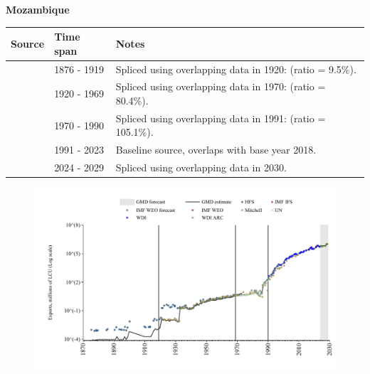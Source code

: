 \documentclass[12pt,a4paper,landscape]{article}
\begin{document}
\begin{adjustbox}{max totalsize={\paperwidth}{\paperheight},center}
\begin{minipage}[t][\textheight][t]{\textwidth}
\vspace*{0.5cm}
{}
\begin{center}
{\Large\bfseries Mozambique}
\end{center}
\vspace{0.5cm}
\begin{table}[H]
\centering
\small
\begin{tabular}{|l|l|l|}
\hline
\textbf{Source} & \textbf{Time span} & \textbf{Notes} \\
\hline
\rowcolor{white}\cite{HFS}& 1876 - 1919 &Spliced using overlapping data in 1920: (ratio = 9.5\%).\\
\rowcolor{lightgray}\cite{Mitchell}& 1920 - 1969 &Spliced using overlapping data in 1970: (ratio = 80.4\%).\\
\rowcolor{white}\cite{UN}& 1970 - 1990 &Spliced using overlapping data in 1991: (ratio = 105.1\%).\\
\rowcolor{lightgray}\cite{WDI}& 1991 - 2023 &Baseline source, overlaps with base year 2018.\\
\rowcolor{white}\cite{IMF_WEO_forecast}& 2024 - 2029 &Spliced using overlapping data in 2030.\\
\hline
\end{tabular}
\end{table}
\begin{figure}[H]
\centering
\includegraphics[width=\textwidth,height=0.6\textheight,keepaspectratio]{graphs/MOZ_exports.pdf}
\end{figure}
\end{minipage}
\end{adjustbox}
\end{document}
